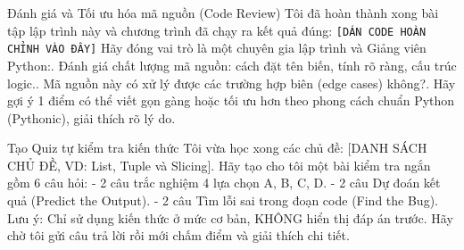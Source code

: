 \documentclass[11pt,a4paper]{article}
\begin{document}
\begin{promptbox}{Đánh giá và Tối ưu hóa mã nguồn (Code Review)}
\small
Tôi đã hoàn thành xong bài tập lập trình này và chương trình đã chạy ra kết quả đúng:\newline
\texttt{[DÁN CODE HOÀN CHỈNH VÀO ĐÂY]}\newline
Hãy đóng vai trò là một chuyên gia lập trình và Giảng viên Python:. Đánh giá chất lượng mã nguồn: cách đặt tên biến, tính rõ ràng, cấu trúc logic.. Mã nguồn này có xử lý được các trường hợp biên (edge cases) không?. Hãy gợi ý 1 điểm có thể viết gọn gàng hoặc tối ưu hơn theo phong cách chuẩn Python (Pythonic), giải thích rõ lý do.
\end{promptbox}

\begin{promptbox}{Tạo Quiz tự kiểm tra kiến thức}
\small
Tôi vừa học xong các chủ đề: [DANH SÁCH CHỦ ĐỀ, VD: List, Tuple và Slicing].\newline
Hãy tạo cho tôi một bài kiểm tra ngắn gồm 6 câu hỏi:\newline
- 2 câu trắc nghiệm 4 lựa chọn A, B, C, D.\newline
- 2 câu Dự đoán kết quả (Predict the Output).\newline
- 2 câu Tìm lỗi sai trong đoạn code (Find the Bug).\newline
Lưu ý: Chỉ sử dụng kiến thức ở mức cơ bản, KHÔNG hiển thị đáp án trước. Hãy chờ tôi gửi câu trả lời rồi mới chấm điểm và giải thích chi tiết.
\end{promptbox}
\end{document}
